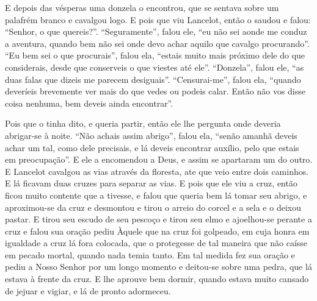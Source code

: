 E depois das vésperas uma donzela o encontrou, que se sentava sobre um
palafrém branco e cavalgou logo. E pois que viu Lancelot, então o saudou e
falou: “Senhor, o que quereis?”. “Seguramente”, falou ele, “eu não sei aonde me
conduz a aventura, quando bem não sei onde devo achar aquilo que cavalgo
procurando”. “Eu bem sei o que procurais”, falou ela, “estais muito mais
próximo dele do que considerais, desde que conserveis o que viestes até ele”.
“Donzela”, falou ele, “as duas falas que dizeis me parecem desiguais”.
“Censurai-me”, falou ela, “quando deveríeis brevemente ver mais do que vedes ou
podeis calar. Então não vos disse coisa nenhuma, bem deveis ainda encontrar”.

Pois que o tinha dito, e queria partir, então ele lhe pergunta onde deveria
abrigar-se à noite. “Não achais assim abrigo”, falou ela, “senão amanhã deveis
achar um tal, como dele precisais, e lá deveis encontrar auxílio, pelo que
estais em preocupação”. E ele a encomendou a Deus, e assim se apartaram um do
outro. E Lancelot cavalgou as vias através da floresta, ate que veio entre
dois caminhos. E lá ficavam duas cruzes para separar as vias. E pois que ele
viu a cruz, então ficou muito contente que a tivesse, e falou que queria bem lá
tomar seu abrigo, e aproximou-se da cruz e desmontou e tirou o arreio do corcel
e a sela e o deixou pastar. E tirou seu escudo de seu pescoço e tirou seu elmo
e ajoelhou-se perante a cruz e falou sua oração pediu Àquele que na cruz foi
golpeado, em cuja honra em igualdade a cruz lá fora colocada, que o protegesse
de tal maneira que não caísse em pecado mortal, quando nada temia tanto. Em tal
medida fez sua oração e pediu a Nosso Senhor por um longo momento e deitou-se
sobre uma pedra, que lá estava à frente da cruz. E lhe aprouve bem dormir,
quando estava muito cansado de jejuar e vigiar, e lá de pronto adormeceu.

